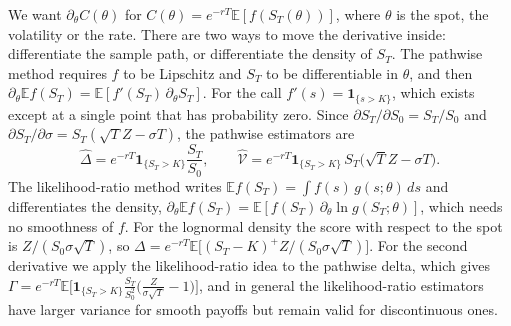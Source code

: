 We want $\partial_\theta C(\theta)$ for $C(\theta)=e^{-rT}\mathbb E[f(S_T(\theta))]$, where $\theta$ is the spot, the volatility or the rate.
There are two ways to move the derivative inside: differentiate the sample path, or differentiate the density of $S_T$.
The pathwise method requires $f$ to be Lipschitz and $S_T$ to be differentiable in $\theta$, and then $\partial_\theta\mathbb E f(S_T)=\mathbb E[f'(S_T)\,\partial_\theta S_T]$.
For the call $f'(s)=\mathbf 1_{\{s>K\}}$, which exists except at a single point that has probability zero.
Since $\partial S_T/\partial S_0=S_T/S_0$ and $\partial S_T/\partial\sigma=S_T(\sqrt TZ-\sigma T)$, the pathwise estimators are
\begin{equation}
 \hat\Delta=e^{-rT}\mathbf 1_{\{S_T>K\}}\frac{S_T}{S_0},\qquad \hat{\mathcal V}=e^{-rT}\mathbf 1_{\{S_T>K\}}\,S_T\big(\sqrt TZ-\sigma T\big).
\end{equation}
The likelihood-ratio method writes $\mathbb Ef(S_T)=\int f(s)\,g(s;\theta)\,ds$ and differentiates the density, $\partial_\theta\mathbb Ef(S_T)=\mathbb E[f(S_T)\,\partial_\theta\ln g(S_T;\theta)]$, which needs no smoothness of $f$.
For the lognormal density the score with respect to the spot is $Z/(S_0\sigma\sqrt T)$, so $\Delta=e^{-rT}\mathbb E\big[(S_T-K)^+Z/(S_0\sigma\sqrt T)\big]$.
For the second derivative we apply the likelihood-ratio idea to the pathwise delta, which gives $\Gamma=e^{-rT}\mathbb E\big[\mathbf 1_{\{S_T>K\}}\tfrac{S_T}{S_0^2}\big(\tfrac{Z}{\sigma\sqrt T}-1\big)\big]$, and in general the likelihood-ratio estimators have larger variance for smooth payoffs but remain valid for discontinuous ones.
